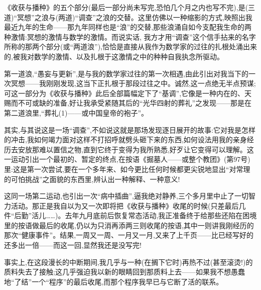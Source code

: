 《收获与播种》的五个部分(最后一部分尚未写完,恐怕几个月之内也写不完),是(三道)“冥想”之浪与(两道)“调查”之浪的交替。这里仿佛以一种缩影的方式,映照出我最近九年的生命——那九年同样也是“浪”的交替,那些浪涌自如今支配我生命的两种激情:冥想的激情与数学的激情。而说实话,%
我方才用“调查”这个信手拈来的名字所称的那两个部分(或“两道浪”),恰恰是直接从我作为数学家的过往的扎根处涌出来的,被我对数学的激情、以及扎根于这激情之中的种种自我执念所驱动。

第一道浪,“愚妄与更新”,是与我的数学家过往的第一次相遇,由此引出对我当下的一次冥想——我刚刚发现,这当下正扎根于那段过往之中。诚然,这一点绝无半点预谋;可这一部分为《收获与播种》此后全部篇幅定下了“基调”,它像是一种内在的、天赐而不可或缺的准备,好让我承受紧随其后的“光华四射的葬礼”之发现——那是在第二道浪里,“葬礼(1)——或中国皇帝的袍子”。

其实,与其说这是一场“调查”,不如说这就是那场发现逐日展开的故事:它对我是怎样的冲击,我如何竭力面对这样不打招呼就劈头砸下来的东西,如何设法用我的亲身经历去安放那难以置信之物,直到它终于变得为我所熟悉,好歹让它变得可以理解。这一运动引出一个最初的、暂定的终点,在按语《掘墓人——或整个教团》(第97号)里:这是第一次尝试,要在一个多年来、如今更比任何时候都更尖锐地显出“对常理的可怕挑战”之面貌的东西里,辨认出一种解释、一种意义!

这同一场第二运动,也引出一次“病中插曲”,逼我绝对静养,三个多月里中止了一切智力活动。那正是我自以为又一次即将把《收获与播种》收尾的时候(只差最后几件“后勤”活儿……)。去年九月底前后恢复常态活动,我正准备终于给那些还陷在困境里的按语做最后的收尾,仍以为只消再添两三则收尾的按语,其中一则讲我刚经历的那次“健康事件”。结果,一周又一周、一月又一月,又来了上千页——比已经写好的还多出一倍——而这一回,显然我还是没写完!

事实上,在这段漫长的中断期间,我几乎与一种(在搁下它时)再热不过(甚至滚烫!)的质料失去了接触;这几乎强迫我以新的眼睛回到那质料上去——如果我不想愚蠢地“了结”一个“程序”的最后收尾,而那个程序我早已与它断了活的联系。

